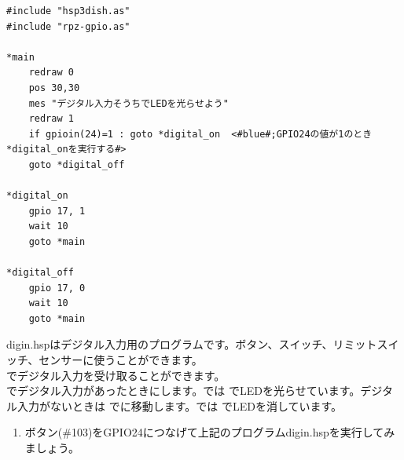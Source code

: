 \begin{lstlisting}[caption=digout.hsp,label=digout.hsp]
#include "hsp3dish.as"
#include "rpz-gpio.as"

*main
	redraw 0
	pos 30,30
	mes "デジタル入力そうちでLEDを光らせよう"
	redraw 1
	if gpioin(24)=1 : goto *digital_on	<#blue#;GPIO24の値が1のとき*digital_onを実行する#>
	goto *digital_off
        
*digital_on
	gpio 17, 1
	wait 10
	goto *main

*digital_off
	gpio 17, 0
	wait 10
	goto *main
\end{lstlisting}

digin.hspはデジタル入力用のプログラムです。ボタン、スイッチ、リミットスイッチ、センサーに使うことができます。\\

でデジタル入力を受け取ることができます。\\

でデジタル入力があったときにします。では でLEDを光らせています。デジタル入力がないときは でに移動します。では でLEDを消しています。

\begin{tcolorbox}[title=\useOmetoi]
\begin{enumerate}
\item ボタン(\#103)をGPIO24につなげて上記のプログラムdigin.hspを実行してみましょう。
\end{enumerate}
\end{tcolorbox}
\begin{tcolorbox}[title=\useOmetoi]
\begin{enumerate}
\end{enumerate}
\end{tcolorbox}
\begin{tcolorbox}[title=\useOmetoi]
\begin{enumerate}
\end{enumerate}
\end{tcolorbox}
\begin{tcolorbox}[title=\useOmetoi]
\begin{enumerate}
\end{enumerate}
\end{tcolorbox}
\begin{tcolorbox}[title=\useOmetoi]
\begin{enumerate}
\end{enumerate}
\end{tcolorbox}


